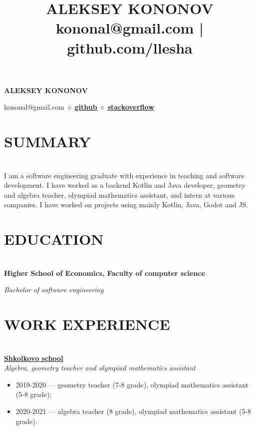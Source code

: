 \documentclass{article}
\title{ALEKSEY KONONOV\\\normalsize{kononal@gmail.com | github.com/llesha}}
\date{ }
\begin{document}
\begin{center}
\huge{\textbf{\quad \quad \quad \quad \quad \quad ALEKSEY KONONOV}}

\normalsize{\hspace{4.5cm} kononal@gmail.com $\diamond$ \href{https://github.com/llesha}{{\textbf{\underline{github}}}}} $\diamond$ \href{https://stackoverflow.com/users/19933941/llesha}{{\textbf{\underline{stackoverflow}}}}
\end{center}

\section*{SUMMARY}
\makebox[530pt]{\rule{570pt}{0.4pt}}\\

\noindent I am a software engineering graduate with experience in teaching and software development.
I have worked as a backend Kotlin and Java developer, geometry and algebra teacher, olympiad mathematics assistant, and intern at various companies. I have worked on projects using mainly Kotlin, Java, Godot and JS.
\section*{EDUCATION}
\makebox[530pt]{\rule{570pt}{0.4pt}}\\

\noindent\textbf{Higher School of Economics, Faculty of computer science}

\noindent \textit{Bachelor of software engineering}
\section*{WORK EXPERIENCE}
\makebox[530pt]{\rule{570pt}{0.4pt}}\\

\noindent\href{https://shkolkovo.net/}{{\textbf{\underline{Shkolkovo school}}}}
\\\textit{Algebra, geometry teacher and olympiad mathematics assistant}
\begin{itemize}
 \item 2019-2020 — geometry teacher (7-8 grade), olympiad mathematics assistant (5-8 grade);
 \item 2020-2021 — algebra teacher (8 grade), olympiad mathematics assistant (5-8 grade).
\end{itemize}
\end{document}
